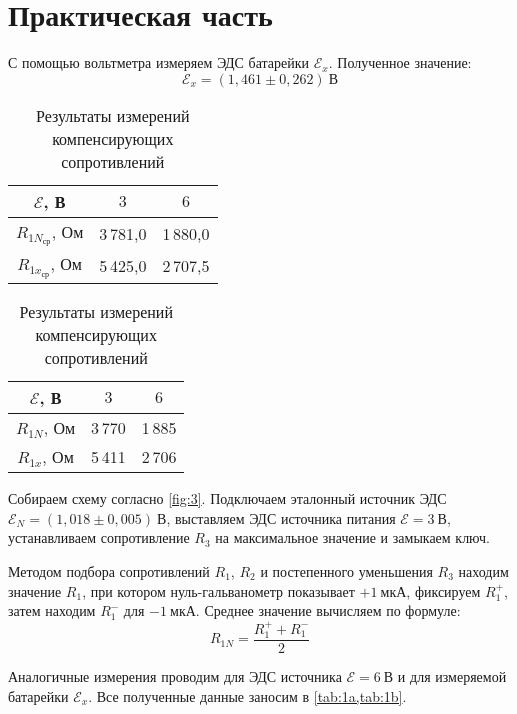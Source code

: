 \section{Практическая часть}

С помощью вольтметра измеряем ЭДС батарейки $\mathcal{E}_x$. Полученное значение:
\[
\mathcal{E}_x = (1{,}461 \pm 0{,}262)\ \text{В}
\]

\begin{table}[h!]
	\centering
	\caption{Результаты измерений компенсирующих сопротивлений}
	\label{tab:1}
	
	\begin{minipage}{0.45\textwidth}
		\centering
		\label{tab:1a}
		\begin{tabular}{ccc}
			\toprule
			$\mathcal{E}$, В & $3$ & $6$ \\
			\midrule
			$R_{1N_{\text{ср}}}$, Ом & 3\,781,0 & 1\,880,0 \\
			$R_{1x_{\text{ср}}}$, Ом & 5\,425,0 & 2\,707,5 \\
			\bottomrule
		\end{tabular}
	\end{minipage}
	\hfill
	\begin{minipage}{0.45\textwidth}
		\centering
		\label{tab:1b}
		\begin{tabular}{ccc}
			\toprule
			$\mathcal{E}$, В & $3$ & $6$ \\
			\midrule
			$R_{1N}$, Ом & 3\,770 & 1\,885 \\
			$R_{1x}$, Ом & 5\,411 & 2\,706 \\
			\bottomrule
		\end{tabular}
	\end{minipage}
\end{table}

Собираем схему согласно \cref{fig:3}. Подключаем эталонный источник ЭДС $\mathcal{E}_N = (1{,}018 \pm 0{,}005)\ \text{В}$, выставляем ЭДС источника питания $\mathcal{E} = 3\ \text{В}$, устанавливаем сопротивление $R_3$ на максимальное значение и замыкаем ключ.

Методом подбора сопротивлений $R_1$, $R_2$ и постепенного уменьшения $R_3$ находим значение $R_1$, при котором нуль-гальванометр показывает $+1\ \text{мкА}$, фиксируем $R_1^+$, затем находим $R_1^-$ для $-1\ \text{мкА}$. Среднее значение вычисляем по формуле:
\[
R_{1N} = \frac{R_1^+ + R_1^-}{2}
\]

Аналогичные измерения проводим для ЭДС источника $\mathcal{E} = 6\ \text{В}$ и для измеряемой батарейки $\mathcal{E}_x$. Все полученные данные заносим в \cref{tab:1a,tab:1b}.

